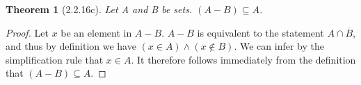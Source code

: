 \documentclass[a4paper, 12pt]{article}
\theoremstyle{plain}
\newtheorem*{theorem*}{Theorem}
\begin{document}
	
	\begin{theorem*}[2.2.16c]
		Let A and B be sets. $(A - B) \subseteq A$.
	\end{theorem*}
	
	\begin{proof}
		Let $x$ be an element in $A - B$. $A - B$ is equivalent to the statement $A \cap \overline{B}$, and thus by definition we have $(x \in A) \land (x \notin B)$. We can infer by the simplification rule that $x \in A$. It therefore follows immediately from the definition that $(A - B) \subseteq A$.
	\end{proof}
\end{document}
